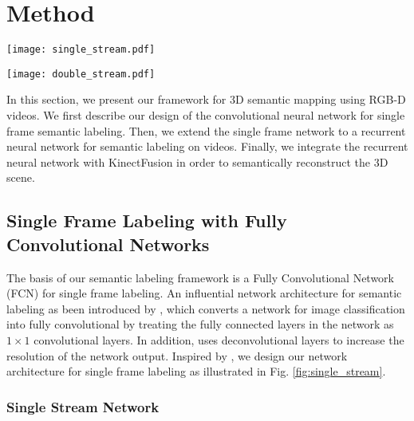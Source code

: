 \documentclass[conference]{IEEEtran}
\begin{document}
\section{Method}

\begin{figure*}
	\centering
	\texttt{[image: single\_stream.pdf]}
	\caption{Architecture of our single stream network for semantic labeling.}
	\label{fig:single_stream}
	\vspace{-3mm}
\end{figure*}

\begin{figure*}
	\centering
	\texttt{[image: double\_stream.pdf]}
	\caption{Architecture of our double stream network for semantic labeling.}
	\label{fig:double_stream}
	\vspace{-4mm}
\end{figure*}


In this section, we present our framework for 3D semantic mapping using RGB-D videos. We first describe our design of the convolutional neural network for single frame semantic labeling. Then, we extend the single frame network to a recurrent neural network for semantic labeling on videos. Finally, we integrate the recurrent neural network with KinectFusion \cite{newcombe2011kinectfusion} in order to semantically reconstruct the 3D scene.

\subsection{Single Frame Labeling with Fully Convolutional Networks}

The basis of our semantic labeling framework is a Fully Convolutional Network (FCN) for single frame labeling. An influential network architecture for semantic labeling as been introduced by \cite{long2015fully}, which converts a network for image classification into fully convolutional by treating the fully connected layers in the network as $1 \times 1$ convolutional layers. In addition, \cite{long2015fully} uses deconvolutional layers to increase the resolution of the network output. Inspired by \cite{long2015fully}, we design our network architecture for single frame labeling as illustrated in Fig. \ref{fig:single_stream}.

\subsubsection{Single Stream Network}
\end{document}
